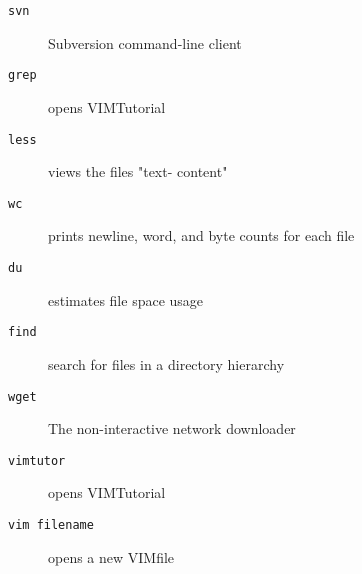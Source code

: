\documentclass[10pt,a4paper]{scrartcl}
\begin{document}
\begin{description}
\begin{terminalcode}
\end{terminalcode}

\item[\texttt{svn}] Subversion command-line client
\begin{terminalcode}
\end{terminalcode}

\item[\texttt{grep}]opens VIMTutorial
\begin{terminalcode}
\end{terminalcode}

\item[\texttt{less}] views the files "text- content"
\begin{terminalcode}
\end{terminalcode}

\item[\texttt{wc}] prints newline, word, and byte counts for each file
\begin{terminalcode}
\end{terminalcode}

\item[\texttt{du}] estimates file space usage
\begin{terminalcode}
\end{terminalcode}

\item[\texttt{find}] search for files in a directory hierarchy
\begin{terminalcode}
\end{terminalcode}

\item[\texttt{wget}]  The non-interactive network downloader
\begin{terminalcode}
\end{terminalcode}

\item[\texttt{vimtutor}]opens VIMTutorial
\begin{terminalcode}
\end{terminalcode}

\item[\texttt{vim filename}]opens a new VIMfile
\begin{terminalcode}
\end{terminalcode}



\end{description}


\end{document}
